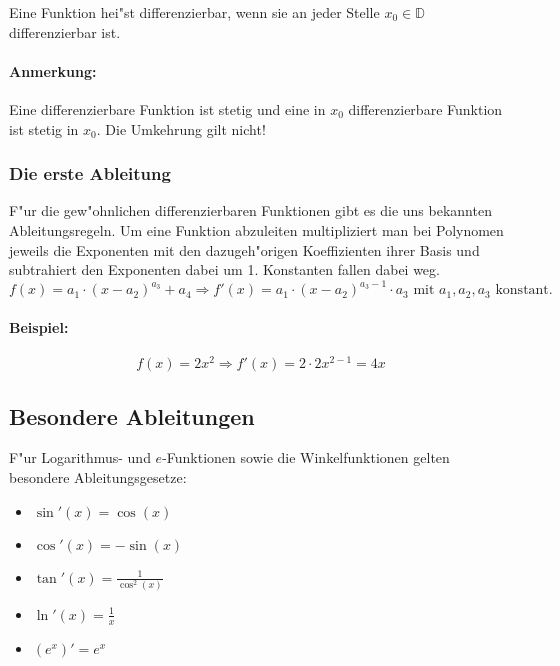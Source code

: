 \begin{definition}[Differenzierbarkeit]
Eine Funktion hei"st differenzierbar, wenn sie an jeder Stelle $x_0 \in \mathbb{D}$ differenzierbar ist.
\end{definition}

\paragraph{Anmerkung:} Eine differenzierbare Funktion ist stetig und eine in $x_0$ differenzierbare Funktion ist stetig in $x_0$. Die Umkehrung gilt nicht!

\subsubsection{Die erste Ableitung}
F"ur die gew"ohnlichen differenzierbaren Funktionen gibt es die uns bekannten Ableitungsregeln. Um eine Funktion abzuleiten multipliziert man bei Polynomen jeweils die Exponenten mit den dazugeh"origen Koeffizienten ihrer Basis und subtrahiert den Exponenten dabei um 1. Konstanten fallen dabei weg.
\begin{equation*}
f(x) = a_1 \cdot (x-a_2)^{a_3} + a_4 \Rightarrow f'(x) = a_1 \cdot (x - a_2)^{a_3-1} \cdot a_3 \text{ mit } a_1,a_2,a_3 \text{ konstant.}
\end{equation*}

\paragraph{Beispiel:}
\begin{equation*}
f(x)=2x^2 \Rightarrow f'(x)= 2 \cdot 2x^{2-1}=4x
\end{equation*}

\subsection{Besondere Ableitungen}
F"ur Logarithmus- und $e$-Funktionen sowie die Winkelfunktionen gelten besondere Ableitungsgesetze:
\begin{itemize}
\item $\sin'(x) = \cos(x)$
\item $\cos'(x) = - \sin(x)$
\item $\tan'(x) = \frac{1}{\cos^2(x)}$
\item $\ln'(x) = \frac{1}{x}$
\item $(e^x)' = e^x$
\end{itemize}

